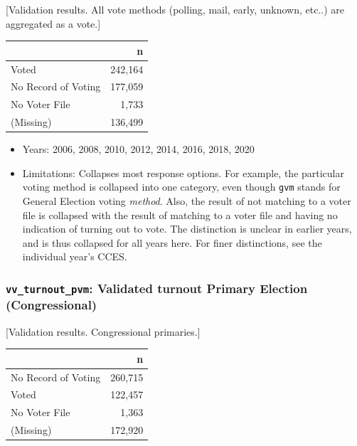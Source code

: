 \documentclass[10pt,article,oneside]{memoir}
\theoremstyle{definition}
\begin{document}
{[}Validation results. All vote methods (polling, mail, early, unknown,
etc..) are aggregated as a vote.{]}

\begin{table}[H]
\centering
\begin{tabular}[t]{lr}
\toprule
 & n\\
\midrule
Voted & 242,164\\
No Record of Voting & 177,059\\
No Voter File & 1,733\\
(Missing) & 136,499\\
\bottomrule
\end{tabular}
\end{table}

\begin{itemize}
\tightlist
\item
  Years: 2006, 2008, 2010, 2012, 2014, 2016, 2018, 2020
\item
  Limitations: Collapses most response options. For example, the
  particular voting method is collapsed into one category, even though
  \texttt{gvm} stands for General Election voting \emph{method}. Also,
  the result of not matching to a voter file is collapsed with the
  result of matching to a voter file and having no indication of turning
  out to vote. The distinction is unclear in earlier years, and is thus
  collapsed for all years here. For finer distinctions, see the
  individual year's CCES.
\end{itemize}

\hypertarget{vv_turnout_pvm-validated-turnout-primary-election-congressional}{%
\subsubsection{\texorpdfstring{\texttt{vv\_turnout\_pvm}: Validated
turnout Primary Election
(Congressional)}{vv\_turnout\_pvm: Validated turnout Primary Election (Congressional)}}\label{vv_turnout_pvm-validated-turnout-primary-election-congressional}}

{[}Validation results. Congressional primaries.{]}

\begin{table}[H]
\centering
\begin{tabular}[t]{lr}
\toprule
 & n\\
\midrule
No Record of Voting & 260,715\\
Voted & 122,457\\
No Voter File & 1,363\\
(Missing) & 172,920\\
\bottomrule
\end{tabular}
\end{table}
\end{document}

